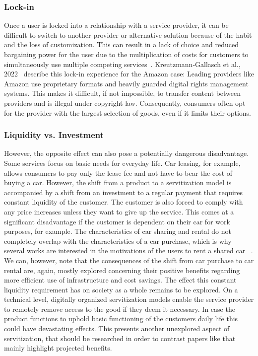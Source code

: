\documentclass[sigplan,screen,nonacm]{acmart}
\begin{document}
\subsubsection{Lock-in}
\label{sec:lock-in}
Once a user is locked into a relationship with a service provider, it can be difficult to switch to another provider or alternative solution because of the habit and the loss of customization. This can result in a lack of choice and reduced bargaining power for the user due to the multiplication of costs for customers to simultaneously use multiple competing services~\cite{Eisenmann2011Platformenvelopment}. Kreutzmann-Gallasch et al., 2022~\cite{kreutzmann2022case} describe this lock-in experience for the Amazon case: Leading providers like Amazon use proprietary formats and heavily guarded digital rights management systems. This makes it difficult, if not impossible, to transfer content between providers and is illegal under copyright law. Consequently, consumers often opt for the provider with the largest selection of goods, even if it limits their options.  

\subsubsection{Liquidity vs. Investment}
However, the opposite effect can also pose a potentially dangerous disadvantage. Some services focus on basic needs for everyday life. Car leasing, for example, allows consumers to pay only the lease fee and not have to bear the cost of buying a car. However, the shift from a product to a servitization model is accompanied by a shift from an investment to a regular payment that requires constant liquidity of the customer. The customer is also forced to comply with any price increases unless they want to give up the service. This comes at a significant disadvantage if the customer is dependent on their car for work purposes, for example. 
The characteristics of car sharing and rental do not completely overlap with the characteristics of a car purchase, which is why several works are interested in the motivations of the users to rent a shared car ~\cite{prieto2022new, mounce2019potential}. We can, however, note that the consequences of the shift from car purchase to car rental are, again, mostly explored concerning their positive benefits regarding more efficient use of infrastructure and cost savings. The effect this constant liquidity requirement has on society as a whole remains to be explored.
On a technical level, digitally organized servitization models enable the service provider to remotely remove access to the good if they deem it necessary. In case the product functions to uphold basic functioning of the customers daily life this could have devastating effects. This presents another unexplored aspect of servitization, that should be researched in order to contrast papers like \cite{prieto2022new, mounce2019potential} that mainly highlight projected benefits. 
\end{document}
